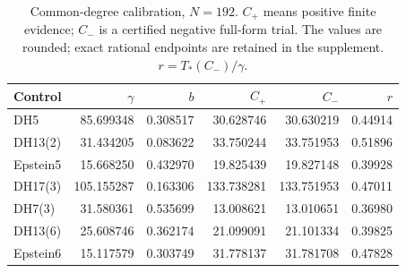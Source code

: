 \begin{table}[ht]
\centering
\small
\caption{Common-degree calibration, $N=192$. $C_+$ means positive finite evidence; $C_-$ is a certified negative full-form trial. The values are rounded; exact rational endpoints are retained in the supplement. $r=T_*(C_-)/\gamma$.}\label{tab:calibration}
\begin{tabular}{lrrrrr}
\toprule Control & $\gamma$ & $b$ & $C_+$ & $C_-$ & $r$\\\midrule
DH5 & 85.699348 & 0.308517 & 30.628746 & 30.630219 & 0.44914 \\
DH13(2) & 31.434205 & 0.083622 & 33.750244 & 33.751953 & 0.51896 \\
Epstein5 & 15.668250 & 0.432970 & 19.825439 & 19.827148 & 0.39928 \\
DH17(3) & 105.155287 & 0.163306 & 133.738281 & 133.751953 & 0.47011 \\
DH7(3) & 31.580361 & 0.535699 & 13.008621 & 13.010651 & 0.36980 \\
DH13(6) & 25.608746 & 0.362174 & 21.099091 & 21.101334 & 0.39825 \\
Epstein6 & 15.117579 & 0.303749 & 31.778137 & 31.781708 & 0.47828 \\
\bottomrule
\end{tabular}
\end{table}
